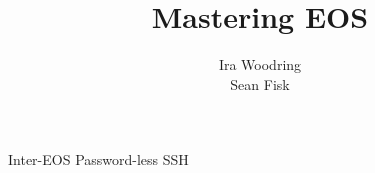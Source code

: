 \documentclass{beamer}
\title{Mastering EOS}
\author[Woodring \& Fisk]{Ira Woodring \mailtohref{woodriir@gvsu.edu} \\
  Sean Fisk \mailtohref{fiskse@mail.gvsu.edu}}
\institute[GVSU]{Grand Valley State University}
\begin{document}
\begin{frame}[fragile]{}
  \vfill
  \begin{block}{\large Inter-EOS Password-less SSH}
    \inputminted{bash}{scripts/ssh.bash}
  \end{block}
  \vfill
\end{frame}

\end{document}
